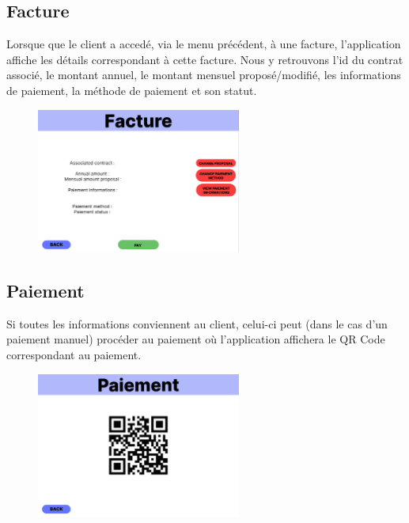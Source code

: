 \subsection{Facture}
\begin{flushleft}
Lorsque que le client a accedé, via le menu précédent, à une facture, l'application affiche les détails correspondant à cette facture. Nous y retrouvons l'id du contrat associé, le montant annuel, le montant mensuel proposé/modifié, les informations de paiement, la méthode de paiement et son statut.
\end{flushleft}
\begin{figure}[h]
\centering
\includegraphics[width = 0.6\textwidth]{extension-maxime/interface/img/facture.png}
\end{figure}

\newpage
\subsection{Paiement}
\begin{flushleft}
Si toutes les informations conviennent au client, celui-ci peut (dans le cas d'un paiement manuel) procéder au paiement où l'application affichera le QR Code correspondant au paiement.
\end{flushleft}
\begin{figure}[h]
\centering
\includegraphics[width = 0.6\textwidth]{extension-maxime/interface/img/paiement.png}
\end{figure}

